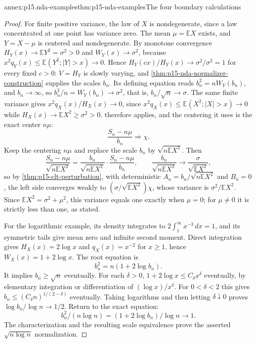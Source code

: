 \begin{annexitem}{annex:p15.nda-examples}{thm:p15-nda-examples}{The four boundary calculations}
\begin{proof}
For finite positive variance, the law of \(X\) is nondegenerate,
since a law concentrated at one point has variance zero.
The mean \(\mu=\mathbb EX\) exists, and \(Y=X-\mu\) is centered
and nondegenerate. By monotone convergence
\(H_Y(x)\to\mathbb EY^2=\sigma^2>0\) and
\(W_Y(x)\to\sigma^2\), because \(x^2q_Y(x)\leq\mathbb E(Y^2;|Y|>x)\to0\).
Hence \(H_Y(cx)/H_Y(x)\to\sigma^2/\sigma^2=1\) for every fixed
\(c>0\): \(V=H_Y\) is slowly varying, and
\cref{thm:p15-nda-normalizer-construction} supplies the scales
\(b_n\). Its defining equation reads \(b_n^2=nW_Y(b_n)\), and
\(b_n\to\infty\), so
\(b_n^2/n=W_Y(b_n)\to\sigma^2\), that is, \(b_n/\sqrt n\to\sigma\).
The same finite variance gives \(x^2q_X(x)/H_X(x)\to0\), since
\(x^2q_X(x)\leq\mathbb E(X^2;|X|>x)\to0\) while
\(H_X(x)\to\mathbb EX^2\geq\sigma^2>0\).
 therefore applies, and the
centering it uses is the exact center \(n\mu\):
\[
 \frac{S_n-n\mu}{b_n}\Rightarrow\chi .
 \]
Keep the centering \(n\mu\) and replace the scale \(b_n\) by
\(\sqrt{n\mathbb EX^2}\). Then
\[
 \frac{S_n-n\mu}{\sqrt{n\mathbb EX^2}}
 =\frac{b_n}{\sqrt{n\mathbb EX^2}}\cdot\frac{S_n-n\mu}{b_n},
 \qquad
 \frac{b_n}{\sqrt{n\mathbb EX^2}}\to\frac{\sigma}{\sqrt{\mathbb EX^2}},
 \]
so by \cref{thm:p15-clt-perturbation}, with deterministic
\(A_n=b_n/\sqrt{n\mathbb EX^2}\) and \(B_n=0\), the left side converges weakly to
\((\sigma/\sqrt{\mathbb EX^2})\chi\), whose variance is
\(\sigma^2/\mathbb EX^2\). Since
\(\mathbb EX^2=\sigma^2+\mu^2\), this variance equals one exactly
when \(\mu=0\); for \(\mu\ne0\) it is strictly less than one, as stated.

For the logarithmic example, its density integrates to
\(2\int_1^\infty x^{-3}\,dx=1\), and its symmetric tails
give mean zero and infinite second moment.
Direct integration gives \(H_X(x)=2\log x\) and
\(q_X(x)=x^{-2}\) for \(x\geq1\), hence
\(W_X(x)=1+2\log x\). The root equation is
\[
 b_n^2=n(1+2\log b_n).
 \]
It implies \(b_n\geq\sqrt n\) eventually.
For each \(\delta>0\), \(1+2\log x\leq C_\delta x^\delta\)
eventually, by elementary integration or differentiation of
\((\log x)/x^\delta\). For \(0<\delta<2\) this gives
\(b_n\leq(C_\delta n)^{1/(2-\delta)}\) eventually.
Taking logarithms and then letting \(\delta\downarrow0\)
proves \(\log b_n/\log n\to1/2\).
Return to the exact equation:
\[
 b_n^2/(n\log n)
       =(1+2\log b_n)/\log n\to1.
 \]
The characterization and the resulting scale equivalence prove
the asserted \(\sqrt{n\log n}\) normalization.


\end{proof}
\end{annexitem}
